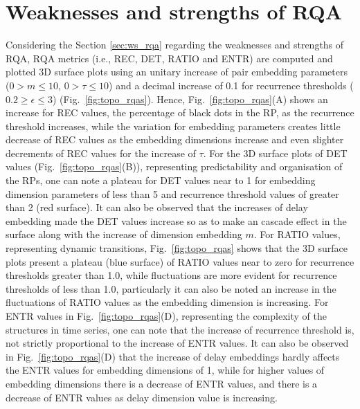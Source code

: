 \newpage
\section{Weaknesses and strengths of RQA}
Considering the Section \ref{sec:ws_rqa} regarding 
the weaknesses and strengths of RQA, 
RQA metrics (i.e., REC, DET, RATIO and ENTR) 
are computed and plotted 3D surface plots using an unitary 
increase of pair embedding parameters 
($0 > m \le 10$, $0 > \tau \le 10$) 
and a decimal increase of 0.1 for recurrence thresholds 
($ 0.2 \ge \epsilon \le 3 $) (Fig.~\ref{fig:topo_rqas}). 
Hence, Fig.~\ref{fig:topo_rqas}(A) shows an increase for 
REC values, the percentage of black dots in the RP, 
as the recurrence threshold increases,
while the variation for embedding parameters creates little decrease 
of REC values as the embedding dimensions increase and even slighter 
decrements of REC values for the increase of $\tau$.
For the 3D surface plots of DET values (Fig.~\ref{fig:topo_rqas}(B)), 
representing 
predictability and organisation of the RPs, one can note a plateau
for DET values near to 1 for embedding dimension parameters of less 
than 5 and recurrence threshold values of greater than 2 (red surface). 
It can also be observed that the increases of delay embedding made 
the DET values increase so as to make an cascade effect in the surface 
along with the increase of dimension embedding $m$.
For RATIO values, representing dynamic transitions, 
Fig.~\ref{fig:topo_rqas} shows that the 3D surface plots present 
a plateau (blue surface) of RATIO values 
near to zero for recurrence thresholds greater than 1.0, while 
fluctuations are more evident for recurrence thresholds of less than 1.0,
particularly it can also be noted an increase in the fluctuations of 
RATIO values as the embedding dimension is increasing. 
For ENTR values in Fig.~\ref{fig:topo_rqas}(D), 
representing the complexity of the structures in time series, 
one can note that the increase of recurrence threshold is, 
not strictly proportional to the increase of ENTR values. 
It can also be observed in Fig.~\ref{fig:topo_rqas}(D)
that the increase of delay embeddings hardly affects 
the ENTR values for embedding dimensions of 1, while 
for higher values of embedding dimensions 
there is a decrease of ENTR values, and 
there is a decrease of ENTR values as delay dimension value is increasing.

